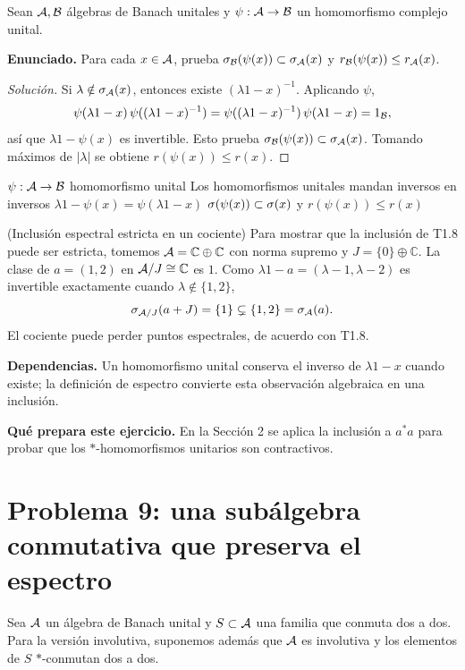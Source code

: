 Sean $\mathcal A,\mathcal B$ álgebras de Banach unitales y $\psi:\mathcal A\to\mathcal B$ un homomorfismo complejo unital.

\noindent\textbf{Enunciado.} Para cada $x\in\mathcal A$, prueba $\sigma_\mathcal B(\psi(x))\subset\sigma_\mathcal A(x)$ y $r_\mathcal B(\psi(x))\le r_\mathcal A(x)$.

\begin{proof}[Solución]
Si $\lambda\notin\sigma_\mathcal A(x)$, entonces existe $(\lambda1-x)^{-1}$. Aplicando $\psi$,
\[
 \psi(\lambda1-x)\,\psi((\lambda1-x)^{-1})
 =\psi((\lambda1-x)^{-1})\,\psi(\lambda1-x)=1_\mathcal B,
\]
así que $\lambda1-\psi(x)$ es invertible. Esto prueba
$\sigma_\mathcal B(\psi(x))\subset\sigma_\mathcal A(x)$. Tomando máximos de $|\lambda|$ se obtiene
$r(\psi(x))\le r(x)$.
\end{proof}

\proofdiagram
{$\psi:\mathcal A\to\mathcal B$ homomorfismo unital}
{Los homomorfismos unitales mandan inversos en inversos}
{$\lambda1-\psi(x)=\psi(\lambda1-x)$}
{$\sigma(\psi(x))\subset\sigma(x)$ y $r(\psi(x))\le r(x)$}

\begin{cthejemplo}{(Inclusión espectral estricta en un cociente)}
Para mostrar que la inclusión de T1.8 puede ser estricta, tomemos
$\mathcal A=\mathbb C\oplus\mathbb C$ con norma supremo y $J=\{0\}\oplus\mathbb C$.
La clase de $a=(1,2)$ en $\mathcal A/J\cong\mathbb C$ es $1$.
Como $\lambda1-a=(\lambda-1,\lambda-2)$ es invertible exactamente cuando
$\lambda\notin\{1,2\}$,
\[
 \sigma_{\mathcal A/J}(a+J)=\{1\}\subsetneq\{1,2\}=\sigma_\mathcal A(a).
\]
El cociente puede perder puntos espectrales, de acuerdo con T1.8.
\end{cthejemplo}

\noindent\textbf{Dependencias.} Un homomorfismo unital conserva el inverso de $\lambda1-x$ cuando existe; la definición de espectro convierte esta observación algebraica en una inclusión.

\noindent\textbf{Qué prepara este ejercicio.} En la Sección 2 se aplica la inclusión a $a^*a$ para probar que los $*$-homomorfismos unitarios son contractivos.

\section{Problema 9: una subálgebra conmutativa que preserva el espectro}

Sea $\mathcal A$ un álgebra de Banach unital y $S\subset\mathcal A$ una familia que conmuta dos a dos. Para la
versión involutiva, suponemos además que $\mathcal A$ es involutiva y los elementos de $S$
$*$-conmutan dos a dos.

